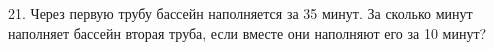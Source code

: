 21. Через первую трубу бассейн наполняется за 35 минут. За сколько минут наполняет бассейн вторая труба, если вместе они наполняют его за 10 минут?\\
